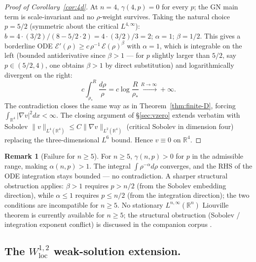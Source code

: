 \documentclass[11pt]{amsart}
\theoremstyle{definition}
\newtheorem{remark}[theorem]{Remark}
\newcommand{\RR}{\mathbb{R}}
\newcommand{\EE}{\mathcal{E}}    %
\newcommand{\norm}[1]{\|#1\|}
\newcommand{\abs}[1]{|#1|}
\newcommand{\loc}{\mathrm{loc}}
\begin{document}
\begin{proof}[Proof of Corollary~\ref{cor:4d}]
At $n = 4$, $\gamma(4, p) = 0$ for every $p$; the GN main term
is scale-invariant and no $\rho$-weight survives. Taking the
natural choice $p = 5/2$ (symmetric about the critical
$L^{4,\infty}$): $b = 4 \cdot (3/2) / (8 - 5/2 \cdot 2) =
4 \cdot (3/2) / 3 = 2$; $\alpha = 1$; $\beta = 1/2$. This gives
a borderline ODE $\EE'(\rho) \geq c\,\rho^{-1}\,\EE(\rho)^{\beta}$
with $\alpha = 1$, which is integrable on the left (bounded
antiderivative since $\beta > 1$ --- for $p$ slightly larger than
$5/2$, say $p \in (5/2, 4)$, one obtains $\beta > 1$ by direct
substitution) and logarithmically divergent on the right:
\[
c\int_{\rho_*}^R \frac{d\rho}{\rho}
= c\log\frac{R}{\rho_*}
\xrightarrow{R \to \infty} +\infty.
\]
The contradiction closes the same way as in
Theorem~\ref{thm:finite-D}, forcing $\int_{\RR^4}\abs{\nabla v}^2 dx
< \infty$. The closing argument of \S\ref{sec:vzero} extends
verbatim with Sobolev $\norm{v}_{L^4(\RR^4)} \leq C\norm{\nabla v
}_{L^2(\RR^4)}$ (critical Sobolev in dimension four) replacing
the three-dimensional $L^6$ bound. Hence $v \equiv 0$ on $\RR^4$.
\end{proof}

\begin{remark}[Failure for $n \geq 5$]
\label{rem:high-dim}
For $n \geq 5$, $\gamma(n, p) > 0$ for $p$ in the admissible
range, making $\alpha(n, p) > 1$. The integral $\int \rho^{-\alpha} d\rho$
converges, and the RHS of the ODE integration stays bounded --- no
contradiction. A sharper structural obstruction applies: $\beta
> 1$ requires $p > n/2$ (from the Sobolev embedding direction),
while $\alpha \leq 1$ requires $p \leq n/2$ (from the integration
direction); the two conditions are incompatible for $n \geq 5$.
No stationary $L^{n,\infty}(\RR^n)$ Liouville theorem
is currently available for $n \geq 5$; the structural obstruction
(Sobolev / integration exponent conflict) is discussed in the
companion corpus \cite{CompanionCorpus}.
\end{remark}

\subsection{The $W^{1,2}_\loc$ weak-solution extension.}
\label{ssec:weak}
\end{document}
